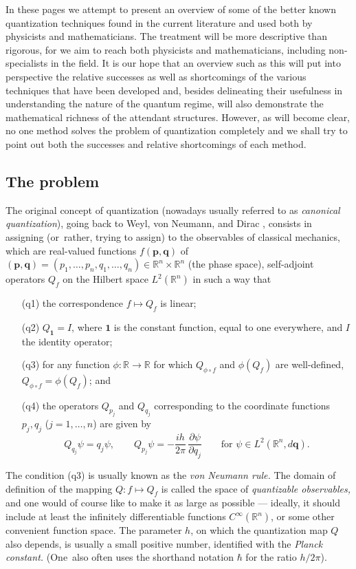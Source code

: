 \documentclass[11pt]{amsart}
\numberwithin{equation}{section}
\theoremstyle{remark}
\let\boldkey\mathbf \let\bold\mathbf
\newcommand\jedna{{\boldkey1}}
\newcommand\RR{\mathbb R}
\newcommand{\bp}{\mathbf p}
\newcommand{\bq}{\mathbf q}
\begin{document}
   In these pages we attempt to present an overview of some of the better known
quantization techniques found in the current literature and used both by
physicists and mathematicians. The treatment will be more descriptive than
rigorous, for we aim to reach both physicists and mathematicians, including
non-specialists in the field. It is our hope that an overview such as this will
put into perspective the relative successes as well as shortcomings of the various
techniques that have been developed and,  besides delineating  their usefulness
in understanding the nature of the quantum regime, will also demonstrate
the mathematical richness of the attendant structures. However, as will become clear,
no one method solves the problem of quantization completely and we shall
try to point out both the successes and relative shortcomings of each method.


\subsection{The problem}

The original concept of quantization (nowadays usually referred to as
{\sl canonical quantization}), going back to Weyl, von Neumann, and Dirac
 \cite{bib:Dirac} \cite{bib:vNeu} \cite{bib:WeyGrleh}, consists in assigning
(or~rather, trying to assign) to the observables of  classical mechanics, which
are real-valued functions $f(\bp,\bq)$ of $(\bp,\bq)=(p_1,\dots,p_n,q_1,\dots,
q_n)\in\RR^n\times\RR^n$ (the phase space),  self-adjoint operators $Q_f$ on
the Hilbert space $L^2(\RR^n)$ in such a way that
\begin{enumerate}
\item[(q1)] the correspondence $f\mapsto Q_f$ is linear;
\item[(q2)] $Q_\jedna=I$, where $\jedna$ is the constant function, equal to one
everywhere, and $I$ the identity operator;
\item[(q3)] for any function $\phi:\RR\to\RR$ for which $Q_{\phi\circ f}$ and
$\phi(Q_f)$ are well-defined,
$Q_{\phi\circ f}=\phi(Q_f)$; and
\item[(q4)] the operators $Q_{p_j}$ and $Q_{q_j}$ corresponding to the
coordinate functions $p_j,q_j$ ($j=1,\dots,n$) are given by
\begin{equation}  Q_{q_j} \psi = q_j \psi,
\qquad Q_{p_j} \psi =-\frac{ih}{2\pi} \,\frac{\partial \psi} {\partial q_j}
\qquad \text{for } \psi \in L^2(\RR^n,d\bq).
\label{tag:Schro}  \end{equation}
\end{enumerate}
The condition (q3) is usually known as the {\sl von Neumann rule.\/}
The domain of definition of the mapping $Q:f\mapsto Q_f$ is called the space of
{\sl quantizable observables,\/} and one would of course like to make it as
large as possible --- ideally, it should include at least the
infinitely differentiable functions $C^\infty(\RR^n)$, or
some other convenient function space. The parameter $h$, on which the
quantization map $Q$ also depends, is usually a small positive number,
identified with the {\sl Planck constant.}
(One~also often uses the shorthand notation $\hbar$ for the ratio $h/2\pi$).
\end{document}
